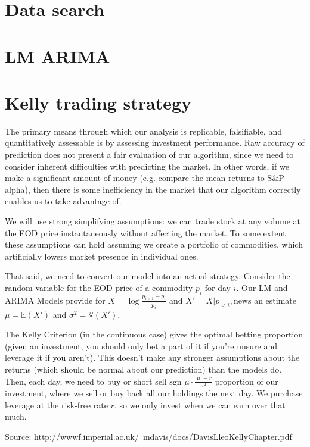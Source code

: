 \documentclass{article}
\begin{document}
	\section{Data search}
	
	\section{LM ARIMA}
	
	\section{Kelly trading strategy}
	
The primary means through which our analysis is replicable, falsifiable, and quantitatively assessable is by assessing investment performance. Raw accuracy of prediction does not present a fair evaluation of our algorithm, since we need to consider inherent difficulties with predicting the market. In other words, if we make a significant amount of money (e.g. compare the mean returns to S\&P alpha), then there is some inefficiency in the market that our algorithm correctly enables us to take advantage of.

We will use strong simplifying assumptions: we can trade stock at any volume at the EOD price instantaneously without affecting the market. To some extent these assumptions can hold assuming we create a portfolio of commodities, which artificially lowers market presence in individual ones.

That said, we need to convert our model into an actual strategy. Consider the random variable for the EOD price of a commodity $p_i$ for day $i$. Our LM and ARIMA Models provide for $X = \log\frac{p_{i+1}-p_i}{p_i}$ and $X'=X|p_{<i},\text{news}$ an estimate $\mu=\mathbb{E}(X')$ and $\sigma^2=\mathbb{V}(X')$.

The Kelly Criterion (in the continuous case) gives the optimal betting proportion (given an investment, you should only bet a part of it if you're unsure and leverage it if you aren't). This doesn't make any stronger assumptions about the returns (which should be normal about our prediction) than the models do. Then, each day, we need to buy or short sell $\text{sgn }\mu\cdot\frac{\left|\mu\right|-r}{\sigma^2}$ proportion of our investment, where we sell or buy back all our holdings the next day. We purchase leverage at the risk-free rate $r$, so we only invest when we can earn over that much.

Source: http://wwwf.imperial.ac.uk/~mdavis/docs/DavisLleoKellyChapter.pdf
\end{document}
